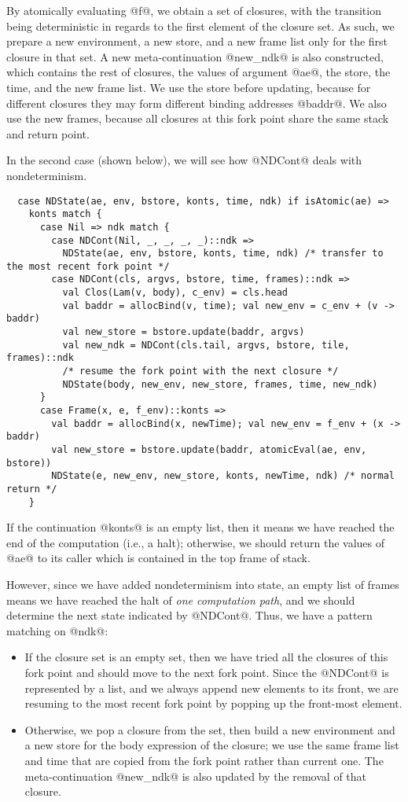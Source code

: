 \documentclass[acmsmall, review]{acmart}\settopmatter{}
\begin{document}
By atomically evaluating @f@, we obtain a set of closures, with the transition being 
deterministic in regards to the first element of the closure set.
As such, we prepare a new environment, a new store, and a new frame list only for the
first closure in that set. A new meta-continuation @new_ndk@ is also constructed,
which contains the rest of closures, the values of argument @ae@, the store, the time,
and the new frame list. We use the store before updating, because for different closures
they may form different binding addresses @baddr@. We also use the new frames, because
all closures at this fork point share the same stack and return point.

In the second case (shown below), we will see how @NDCont@ deals with nondeterminism.

\begin{lstlisting}
  case NDState(ae, env, bstore, konts, time, ndk) if isAtomic(ae) =>
    konts match {
      case Nil => ndk match {
        case NDCont(Nil, _, _, _, _)::ndk =>
          NDState(ae, env, bstore, konts, time, ndk) /* transfer to the most recent fork point */
        case NDCont(cls, argvs, bstore, time, frames)::ndk =>
          val Clos(Lam(v, body), c_env) = cls.head
          val baddr = allocBind(v, time); val new_env = c_env + (v -> baddr)
          val new_store = bstore.update(baddr, argvs)
          val new_ndk = NDCont(cls.tail, argvs, bstore, tile, frames)::ndk
          /* resume the fork point with the next closure */
          NDState(body, new_env, new_store, frames, time, new_ndk)
      }
      case Frame(x, e, f_env)::konts =>
        val baddr = allocBind(x, newTime); val new_env = f_env + (x -> baddr)
        val new_store = bstore.update(baddr, atomicEval(ae, env, bstore))
        NDState(e, new_env, new_store, konts, newTime, ndk) /* normal return */
    }
\end{lstlisting}

If the continuation @konts@ is an empty list, then it means we have reached
the end of the computation (i.e., a halt); otherwise, we should return the values of 
@ae@ to its caller which is contained in the top frame of stack.

However, since we have added nondeterminism into state, an empty list of frames means
we have reached the halt of \textit{one computation path}, and we should determine the
next state indicated by @NDCont@. Thus, we have a pattern matching on @ndk@:

\begin{itemize}
  \item If the closure set is an empty set,
then we have tried all the closures of this fork point and should move to the
next fork point. Since the @NDCont@ is represented by a list, and we always
append new elements to its front, we are resuming to the most recent fork point by
popping up the front-most element.
  \item Otherwise, we pop a closure from the set, then build a new
environment and a new store for the body expression of the closure;
we use the same frame list and time that are copied from the fork point rather
than current one.
The meta-continuation @new_ndk@ is also updated by the removal of that closure.
\end{itemize}
\end{document}
